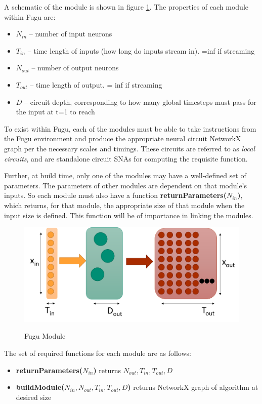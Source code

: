 \documentclass{article}
\begin{document}
A schematic of the module is shown in figure \ref{module}. The properties of each module within Fugu are:

\begin{itemize}
\item $N_{in}$ -- number of input neurons
\item $T_{in}$ -- time length of inputs (how long do inputs stream in).  =inf if streaming
\item $N_{out}$ -- number of output neurons
\item $T_{out}$ -- time length of output.  = inf if streaming
\item $D$ -- circuit depth, corresponding to how many global timesteps must pass for the input at t=1 to reach  
\end{itemize}

To exist within Fugu, each of the modules must be able to take instructions from the Fugu environment and produce the appropriate neural circuit NetworkX graph per the necessary scales and timings.  These circuits are referred to as \textit{local circuits}, and are standalone circuit SNAs for computing the requisite function.  

Further, at build time, only one of the modules may have a well-defined set of parameters.  The parameters of other modules are dependent on that module's inputs. So each module must also have a function \textbf{returnParameters($N_{in}$)}, which returns, for that module, the appropriate size of that module when the input size is defined.  This function will be of importance in linking the modules.

\begin{figure}
	\includegraphics[width=5in]{module_simple.png}
	\label{module}
	\caption{Fugu Module}
\end{figure}

The set of required functions for each module are as follows:

\begin{itemize}
	\item \textbf{returnParameters($N_{in}$)} returns $N_{out}, T_{in}, T_{out}, D$
	\item \textbf{buildModule($N_{in}, N_{out}, T_{in}, T_{out}, D$)} returns NetworkX graph of algorithm at desired size
\end{itemize}
\end{document}
